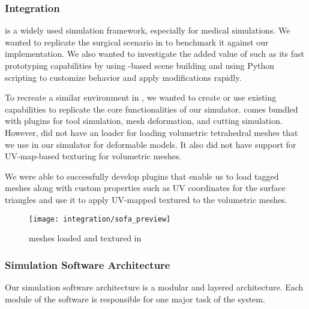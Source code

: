 \subsubsection{ Integration}
 is a widely used simulation framework, especially for medical simulations. We wanted to replicate the surgical scenario in  to benchmark it against our implementation. We also wanted to investigate the added value of  such as its fast prototyping capabilities by using -based scene building and using Python scripting to customize behavior and apply modifications rapidly.

To recreate a similar environment in , we wanted to create or use existing  capabilities to replicate the core functionalities of our simulator.  comes bundled with plugins for tool simulation, mesh deformation, and cutting simulation. However,  did not have an  loader for loading volumetric tetrahedral meshes that we use in our simulator for deformable models. It also did not have support for UV-map-based texturing for volumetric meshes.

We were able to successfully develop plugins that enable us to load tagged  meshes along with custom properties such as UV coordinates for the surface triangles and use it to apply UV-mapped textured to the volumetric meshes.

\begin{figure}
  \centering
  \texttt{[image: integration/sofa\_preview]}
  \caption{ meshes loaded and textured in }
  \label{fig:sofa_preview}
\end{figure}

\subsubsection{Simulation Software Architecture}
\label{sec:software_architecture}
Our simulation software architecture is a modular and layered architecture. Each module of the software is responsible for one major task of the system.

